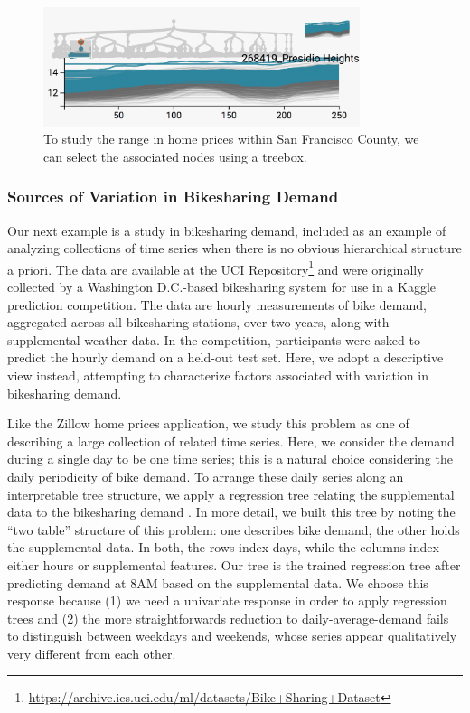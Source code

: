 \documentclass[12pt]{article}
\begin{document}
\begin{figure}

{\centering \includegraphics[width=350px]{figure/zillow_sf}

}

\caption{To study the range in home prices within San Francisco County, we can select the associated nodes using a treebox.}\label{fig:zillowsf}
\end{figure}

\subsubsection*{Sources of Variation in Bikesharing
Demand}\label{bikesharing-study}

Our next example is a study in bikesharing demand, included as an
example of analyzing collections of time series when there is no obvious
hierarchical structure a priori. The data are available at the UCI
Repository\footnote{\url{https://archive.ics.uci.edu/ml/datasets/Bike+Sharing+Dataset}}
and were originally collected by a Washington D.C.-based bikesharing
system for use in a Kaggle prediction competition. The data are hourly
measurements of bike demand, aggregated across all bikesharing stations,
over two years, along with supplemental weather data. In the
competition, participants were asked to predict the hourly demand on a
held-out test set. Here, we adopt a descriptive view instead, attempting
to characterize factors associated with variation in bikesharing demand.

Like the Zillow home prices application, we study this problem as one of
describing a large collection of related time series. Here, we consider
the demand during a single day to be one time series; this is a natural
choice considering the daily periodicity of bike demand. To arrange
these daily series along an interpretable tree structure, we apply a
regression tree relating the supplemental data to the bikesharing demand
\citep{breiman1984classification}. In more
detail, we built this tree by noting the ``two table'' structure of this
problem: one describes bike demand, the other holds the supplemental
data. In both, the rows index days, while the columns index either hours
or supplemental features. Our tree is the trained regression tree after
predicting demand at 8AM based on the supplemental data. We choose this
response because (1) we need a univariate response in order to apply
regression trees and (2) the more straightforwards reduction to
daily-average-demand fails to distinguish between weekdays and weekends,
whose series appear qualitatively very different from each other.
\end{document}
